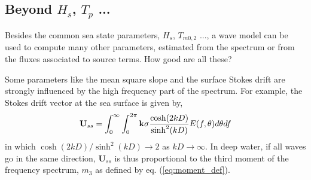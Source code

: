 


\subsection{Beyond $H_s$, $T_p$ ... }
Besides the common sea state parameters, $H_s$, $T_{m0,2}$  ..., 
a wave model can be used to compute many other parameters, estimated from the 
spectrum or from the fluxes associated to source terms. 
How good are all these? 

Some parameters like the mean square slope and the surface Stokes drift are 
strongly influenced by the high frequency part of the spectrum. For example, the Stokes drift vector at the sea surface is given by,
\begin{equation}
 \mathbf{U}_{ss} =  \int_{0}^{\infty}\int_{0}^{2\pi} \mathbf{k} \sigma \frac{\cosh(2kD)}{\sinh^2(kD)} E(f,\theta)d\theta df
\end{equation}
in which ${\cosh(2kD)}/{\sinh^2(kD)} \rightarrow 2$ as $kD \rightarrow \infty$. In deep water,  if all waves go in the same direction, $\mathbf{U}_{ss}$
is thus proportional to the third moment of the frequency spectrum, $m_{3}$ as defined by eq. (\ref{eq:moment_def}).




